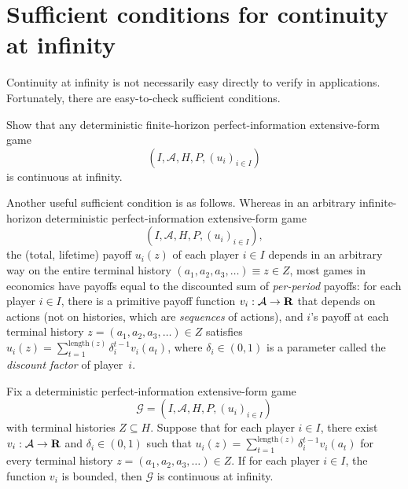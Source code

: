 \section{Sufficient conditions for continuity at infinity}
\label{osdp:suff}

Continuity at infinity is not necessarily easy directly to verify in applications. Fortunately, there are easy-to-check sufficient conditions.

\begin{exercise}
	\label{exercise:conts_infty_finite}
	Show that any deterministic finite-horizon perfect-information extensive-form game
	\begin{equation*}
		(I,\mathcal{A},H,P,(u_i)_{i \in I}) 
	\end{equation*}
	is continuous at infinity.
\end{exercise}

Another useful sufficient condition is as follows. Whereas in an arbitrary infinite-horizon deterministic perfect-information extensive-form game
%
\begin{equation*}
	(I,\mathcal{A},H,P,(u_i)_{i \in I}) ,
\end{equation*}
%
the (total, lifetime) payoff $u_i(z)$ of each player $i \in I$ depends in an arbitrary way on the entire terminal history $(a_1,a_2,a_3,\dots) \equiv z \in Z$, most games in economics have payoffs equal to the discounted sum of \emph{per-period} payoffs: for each player $i \in I$, there is a primitive payoff function $v_i : \mathcal{A} \to \mathbf{R}$ that depends on actions (not on histories, which are \emph{sequences} of actions), and $i$'s payoff at each terminal history $z = (a_1,a_2,a_3,\dots) \in Z$ satisfies $u_i(z) = \sum_{t=1}^{\text{length}(z)} \delta_i^{t-1} v_i(a_t)$, where $\delta_i \in (0,1)$ is a parameter called the \emph{discount factor} of player~$i$.

\begin{proposition}
	\label{proposition:conts_infty_disc}
	Fix a deterministic perfect-information extensive-form game
	\begin{equation*}
		\mathcal{G} = (I,\mathcal{A},H,P,(u_i)_{i \in I}) 
	\end{equation*}
	with terminal histories $Z \subseteq H$. Suppose that for each player $i \in I$, there exist $v_i : \mathcal{A} \to \mathbf{R}$ and $\delta_i \in (0,1)$ such that $u_i(z) = \sum_{t=1}^{\text{length}(z)} \delta_i^{t-1} v_i(a_t)$ for every terminal history $z=(a_1,a_2,a_3,\dots) \in Z$. If for each player $i \in I$, the function $v_i$ is bounded, then $\mathcal{G}$ is continuous at infinity.
\end{proposition}

